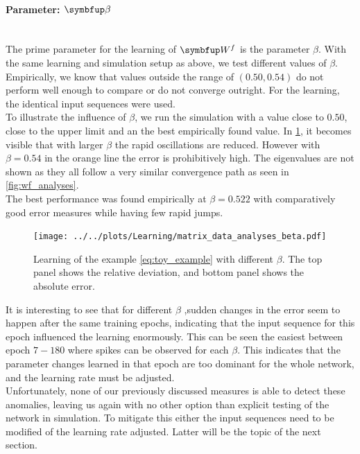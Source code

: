 \paragraph{Parameter: $\bmu{\beta}$}\mbox{}\\
The prime parameter for the learning of $\bmu{W}^f$ is the parameter $\beta$. With the same learning and simulation setup as above, we test different values of $\beta$. Empirically, we know that values outside the range of $(0.50,0.54)$ do not perform well enough to compare or do not converge outright. For the learning, the identical input sequences were used.\\
To illustrate the influence of $\beta$, we run the simulation with a value close to $0.50$, close to the upper limit and an the best empirically found value. In \cref{fig:beta_study}, it becomes visible that with larger $\beta$ the rapid oscillations are reduced. However with $\beta = 0.54$ in the orange line the error is prohibitively high. The eigenvalues are not shown as they all follow a very similar convergence path as seen in \cref{fig:wf_analyses}.\\
The best performance was found empirically at $\beta = 0.522$ with comparatively good error measures while having few rapid jumps.\\
\begin{figure}
	\centering
	\texttt{[image: ../../plots/Learning/matrix\_data\_analyses\_beta.pdf]}
	\caption{Learning of the example \cref{eq:toy_example} with different $\beta$. The top panel shows the relative deviation, and bottom panel shows the absolute error.}
	\label{fig:beta_study}
\end{figure}

It is interesting to see that for different $\beta$ ,sudden changes in the error seem to happen after the same training epochs, indicating that the input sequence for this epoch influenced the learning enormously. This can be seen the easiest between epoch $7-180$ where spikes can be observed for each $\beta$. This indicates that the parameter changes learned in that epoch are too dominant for the whole network, and the learning rate must be adjusted.\\
Unfortunately, none of our previously discussed measures is able to detect these anomalies, leaving us again with no other option than explicit testing of the network in simulation. To mitigate this either the input sequences need to be modified of the learning rate adjusted. Latter will be the topic of the next section.\\


